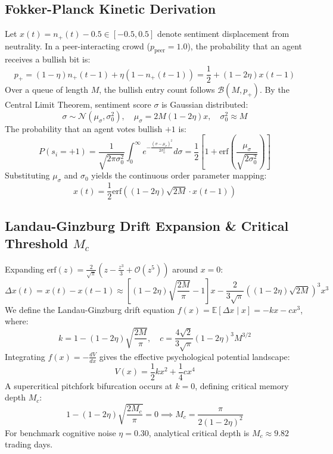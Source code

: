 \documentclass[11pt,a4paper]{article}
\begin{document}
\subsection{Fokker-Planck Kinetic Derivation}
Let $x(t) = n_+(t) - 0.5 \in [-0.5, 0.5]$ denote sentiment displacement from neutrality. In a peer-interacting crowd ($p_{\text{peer}}=1.0$), the probability that an agent receives a bullish bit is:
\begin{equation}
    p_+ = (1-\eta) n_+(t-1) + \eta (1 - n_+(t-1)) = \frac{1}{2} + (1-2\eta) x(t-1)
\end{equation}
Over a queue of length $M$, the bullish entry count follows $\mathcal{B}(M, p_+)$. By the Central Limit Theorem, sentiment score $\sigma$ is Gaussian distributed:
\begin{equation}
    \sigma \sim \mathcal{N}\left( \mu_\sigma, \sigma_0^2 \right), \quad \mu_\sigma = 2M(1-2\eta)x, \quad \sigma_0^2 \approx M
\end{equation}
The probability that an agent votes bullish $+1$ is:
\begin{equation}
    P(s_i = +1) = \frac{1}{\sqrt{2\pi \sigma_0^2}} \int_{0}^{\infty} e^{-\frac{(\sigma - \mu_\sigma)^2}{2\sigma_0^2}} d\sigma = \frac{1}{2} \left[ 1 + \text{erf}\left( \frac{\mu_\sigma}{\sqrt{2\sigma_0^2}} \right) \right]
\end{equation}
Substituting $\mu_\sigma$ and $\sigma_0$ yields the continuous order parameter mapping:
\begin{equation}
    x(t) = \frac{1}{2} \text{erf}\left( (1-2\eta) \sqrt{2M} \cdot x(t-1) \right)
\end{equation}

\subsection{Landau-Ginzburg Drift Expansion \& Critical Threshold $M_c$}
Expanding $\text{erf}(z) = \frac{2}{\sqrt{\pi}} \left( z - \frac{z^3}{3} + \mathcal{O}(z^5) \right)$ around $x=0$:
\begin{equation}
    \Delta x(t) = x(t) - x(t-1) \approx \left[ (1-2\eta) \sqrt{\frac{2M}{\pi}} - 1 \right] x - \frac{2}{3\sqrt{\pi}} \left( (1-2\eta)\sqrt{2M} \right)^3 x^3
\end{equation}
We define the Landau-Ginzburg drift equation $f(x) = \mathbb{E}[\Delta x \mid x] = -k x - c x^3$, where:
\begin{equation}
    k = 1 - (1-2\eta) \sqrt{\frac{2M}{\pi}}, \quad c = \frac{4\sqrt{2}}{3\sqrt{\pi}} (1-2\eta)^3 M^{3/2}
\end{equation}
Integrating $f(x) = -\frac{dV}{dx}$ gives the effective psychological potential landscape:
\begin{equation}
    V(x) = \frac{1}{2} k x^2 + \frac{1}{4} c x^4
\end{equation}
A supercritical pitchfork bifurcation occurs at $k=0$, defining critical memory depth $M_c$:
\begin{equation}
    1 - (1-2\eta)\sqrt{\frac{2M_c}{\pi}} = 0 \implies M_c = \frac{\pi}{2(1-2\eta)^2}
\end{equation}
For benchmark cognitive noise $\eta = 0.30$, analytical critical depth is $M_c \approx 9.82$ trading days.
\end{document}
